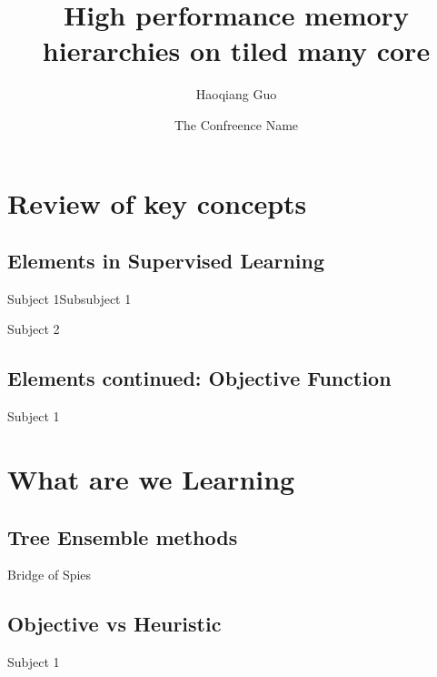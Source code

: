 \documentclass[hyperref={pdfpagelabels=false}]{beamer}
\title{High performance memory hierarchies on tiled many core}
\author[H.q. Guo]{Haoqiang Guo \texttt{}}
\institute[ECE LSU]{%
Electrical $\&$ Computer Engineering\\
Louisiana State University
}
\date[2018,Beijing]{The Confreence Name}
\begin{document}
\titlepage


\section{Review of key concepts}
\subsection{Elements in Supervised Learning}

\begin{frame}{Subject 1}{Subsubject 1}
\end{frame}

\begin{frame}{Subject 2}
\end{frame}
\subsection{Elements continued: Objective Function}
\begin{frame}{Subject 1}
\end{frame}
\section{What are we Learning}
\subsection{Tree Ensemble methods}
\begin{frame}{Bridge of Spies}
\end{frame}
\subsection{Objective vs Heuristic}
\begin{frame}{Subject 1} 
\end{frame}

\end{document}
